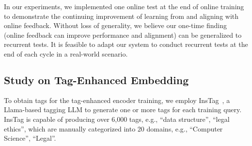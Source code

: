 \begin{table}[htbp]
    \centering
    \caption{The Power of Continual Training
    }
    \label{tab:online_training_comparison}
\end{table}

In our experiments, we implemented one online test at the end of online training to demonstrate the continuing improvement of learning from and aligning with online feedback. Without loss of generality, we believe our one-time finding (online feedback can improve performance and alignment) can be generalized to recurrent tests. It is feasible to adapt our system to conduct recurrent tests at the end of each cycle in a real-world scenario.


\subsection{Study on Tag-Enhanced Embedding}


To obtain tags for the tag-enhanced encoder training, we employ InsTag~\cite{lu2023instag}, a Llama-based tagging LLM to generate one or more tags for each training query. InsTag is capable of producing over 6,000 tags, e.g., ``data structure'', ``legal ethics'', which are manually categorized into 20 domains, e.g., ``Computer Science'', ``Legal''. 



